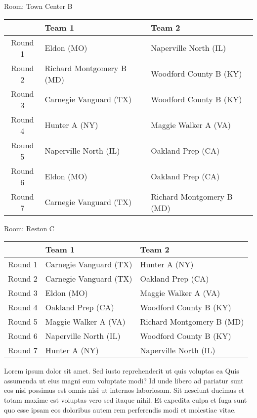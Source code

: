 \documentclass{article}%
\begin{document}
\vspace*{8pt}%
\linebreak%
\begin{flushleft}%
\begin{Large}%
Room: Town Center B%
\end{Large}%
\end{flushleft}%
\begin{tabularx}{\textwidth}{|c|Y|Y|}%
\hline%
&Team 1&Team 2\\%
\hline%
Round 1&Eldon (MO)&Naperville North (IL)\\%
Round 2&Richard Montgomery B (MD)&Woodford County B (KY)\\%
Round 3&Carnegie Vanguard (TX)&Woodford County B (KY)\\%
Round 4&Hunter A (NY)&Maggie Walker A (VA)\\%
Round 5&Naperville North (IL)&Oakland Prep (CA)\\%
Round 6&Eldon (MO)&Oakland Prep (CA)\\%
Round 7&Carnegie Vanguard (TX)&Richard Montgomery B (MD)\\%
\hline%
\end{tabularx}%
\vspace*{8pt}%
\linebreak%
\begin{flushleft}%
\begin{Large}%
Room: Reston C%
\end{Large}%
\end{flushleft}%
\begin{tabularx}{\textwidth}{|c|Y|Y|}%
\hline%
&Team 1&Team 2\\%
\hline%
Round 1&Carnegie Vanguard (TX)&Hunter A (NY)\\%
Round 2&Carnegie Vanguard (TX)&Oakland Prep (CA)\\%
Round 3&Eldon (MO)&Maggie Walker A (VA)\\%
Round 4&Oakland Prep (CA)&Woodford County B (KY)\\%
Round 5&Maggie Walker A (VA)&Richard Montgomery B (MD)\\%
Round 6&Naperville North (IL)&Woodford County B (KY)\\%
Round 7&Hunter A (NY)&Naperville North (IL)\\%
\hline%
\end{tabularx}%
\vspace*{8pt}%
\linebreak%
\newline%
Lorem ipsum dolor sit amet. Sed iusto reprehenderit ut quis voluptas ea Quis assumenda ut eius magni eum voluptate modi? Id unde libero ad pariatur sunt eos nisi possimus est omnis nisi ut internos laboriosam. Sit nesciunt ducimus et totam maxime est voluptas vero sed itaque nihil. Et expedita culpa et fuga sunt quo esse ipsam eos doloribus autem rem perferendis modi et molestiae vitae.\newline%
\end{document}
